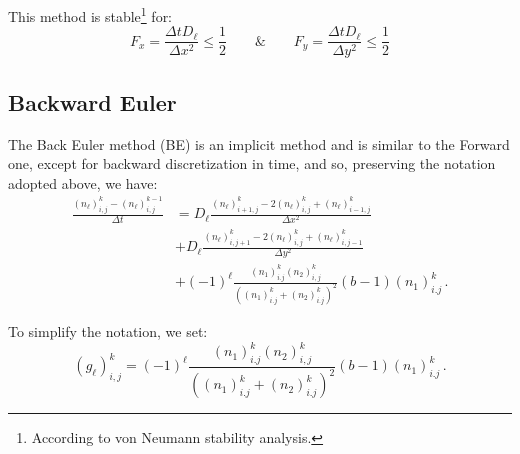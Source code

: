 This method is stable\footnote{According to von Neumann stability analysis. }
for:
\begin{equation}
F_{x}=\frac{\Delta tD_{\ell}}{\Delta x^{2}}\leq\frac{1}{2}\qquad\&\qquad F_{y}=\frac{\Delta tD_{\ell}}{\Delta y^{2}}\leq\frac{1}{2}\label{eq:stablity}
\end{equation}


\subsection{Backward Euler}

The Back Euler method (BE) is an implicit method and is similar to
the Forward one, except for backward discretization in time, and so,
preserving the notation adopted above, we have:
\begin{align*}
\frac{\left(n_{\ell}\right)_{i,j}^{k}-\left(n_{\ell}\right)_{i,j}^{k-1}}{\Delta t} & =D_{\ell}\frac{\left(n_{\ell}\right)_{i+1,j}^{k}-2\left(n_{\ell}\right)_{i,j}^{k}+\left(n_{\ell}\right)_{i-1,j}^{k}}{\Delta x^{2}}\\
 & +D_{\ell}\frac{\left(n_{\ell}\right)_{i,j+1}^{k}-2\left(n_{\ell}\right)_{i,j}^{k}+\left(n_{\ell}\right)_{i,j-1}^{k}}{\Delta y^{2}}\\
 & +\left(-1\right)^{\ell}\frac{\left(n_{1}\right)_{i.j}^{k}\left(n_{2}\right)_{i,j}^{k}}{\left(\left(n_{1}\right)_{i.j}^{k}+\left(n_{2}\right)_{i.j}^{k}\right)^{2}}\left(b-1\right)\left(n_{1}\right)_{i.j}^{k}\,.
\end{align*}

To simplify the notation, we set:
\[
\left(g_{\ell}\right)_{i,j}^{k}=\left(-1\right)^{\ell}\frac{\left(n_{1}\right)_{i.j}^{k}\left(n_{2}\right)_{i,j}^{k}}{\left(\left(n_{1}\right)_{i.j}^{k}+\left(n_{2}\right)_{i.j}^{k}\right)^{2}}\left(b-1\right)\left(n_{1}\right)_{i.j}^{k}\,.
\]

